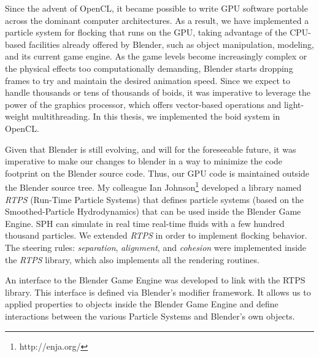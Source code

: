 Since the advent of OpenCL, it became possible to write GPU software portable across the dominant computer architectures. As a result, we have implemented a particle system for flocking that runs on the GPU, taking advantage of the CPU-based facilities already offered by Blender, such as object manipulation, modeling, and its current game engine. As the game levels  become increasingly complex or the physical effects too computationally demanding, Blender starts dropping frames to try and maintain the desired animation speed. Since we expect to handle thousands or tens of thousands of boids, it was imperative to leverage the power of the graphics processor, which offers vector-based operations and light-weight multithreading. In this thesis, we implemented the boid system in OpenCL.



Given that Blender is still evolving, and will for the foreseeable future, it was imperative to make our changes to blender in a way to minimize the code footprint on the Blender source code. Thus, our
GPU code is maintained outside the Blender source tree. My colleague Ian Johnson\footnote{http://enja.org/} developed a library named \textit{RTPS} (Run-Time Particle Systems) that defines particle systems (based on the Smoothed-Particle Hydrodynamics) that can be used inside the Blender Game Engine. SPH can simulate in real time real-time fluids with a few hundred thousand particles. 
We extended \textit{RTPS} in order to implement flocking behavior. The steering rules: \textit{separation}, \textit{alignment}, and \textit{cohesion} were implemented inside the \textit{RTPS} library, which also implements all the rendering routines.



An interface to the Blender Game Engine was developed to link with the RTPS library. This interface is defined via Blender's modifier framework. It allows us to applied properties to objects inside the Blender Game Engine and define interactions between the various Particle Systems and Blender's own objects.


